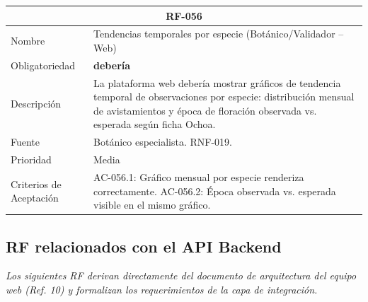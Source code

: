 \documentclass[12pt, a4paper]{article}
\begin{document}
\begin{longtable}{|p{3cm}|p{11.5cm}|}
\hline
\multicolumn{2}{|c|}{\textbf{RF-056}} \\
\hline
Nombre & Tendencias temporales por especie (Bot\'anico/Validador -- Web) \\
\hline
Obligatoriedad & \textbf{deber\'ia} \\
\hline
Descripci\'on & La plataforma web deber\'ia mostrar gr\'aficos de tendencia temporal de observaciones por especie: distribuci\'on mensual de avistamientos y \'epoca de floraci\'on observada vs. esperada seg\'un ficha Ochoa. \\
\hline
Fuente & Bot\'anico especialista. RNF-019. \\
\hline
Prioridad & Media \\
\hline
Criterios de Aceptaci\'on &
AC-056.1: Gr\'afico mensual por especie renderiza correctamente. \newline
AC-056.2: \'Epoca observada vs. esperada visible en el mismo gr\'afico. \\
\hline
\end{longtable}

\subsection{RF relacionados con el API Backend}

\textit{Los siguientes RF derivan directamente del documento de arquitectura del equipo web (Ref. 10) y formalizan los requerimientos de la capa de integraci\'on.}
\end{document}

